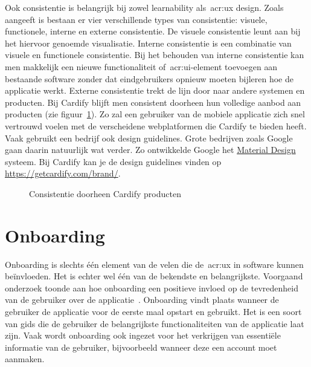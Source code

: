 Ook consistentie is belangrijk bij zowel learnability als~\acrshort{acr:ux} design. Zoals~\textcite{Nikolov2017} aangeeft is bestaan er vier verschillende types van consistentie: visuele, functionele, interne en externe consistentie. De visuele consistentie leunt aan bij het hiervoor genoemde visualisatie. Interne consistentie is een combinatie van visuele en functionele consistentie. Bij het behouden van interne consistentie kan men makkelijk een nieuwe functionaliteit of~\acrshort{acr:ui}-element toevoegen aan bestaande software zonder dat eindgebruikers opnieuw moeten bijleren hoe de applicatie werkt. Externe consistentie trekt de lijn door naar andere systemen en producten. Bij Cardify blijft men consistent doorheen hun volledige aanbod aan producten (zie figuur~\ref{fig:learnability:consistentie-cardify}). Zo zal een gebruiker van de mobiele applicatie zich snel vertrouwd voelen met de verscheidene webplatformen die Cardify te bieden heeft. Vaak gebruikt een bedrijf ook design guidelines. Grote bedrijven zoals Google gaan daarin natuurlijk wat verder. Zo ontwikkelde Google het \href{https://material.io/}{Material Design} systeem. Bij Cardify kan je de design guidelines vinden op \url{https://getcardify.com/brand/}.


\begin{figure}
    \centering
    \qquad
    \caption{Consistentie doorheen Cardify producten}
    \label{fig:learnability:consistentie-cardify}
\end{figure}

\section{Onboarding}
\label{sec:onboarding}

Onboarding is slechts één element van de velen die de~\acrlong{acr:ux} in software kunnen beïnvloeden. Het is echter wel één van de bekendste en belangrijkste. Voorgaand onderzoek toonde  aan hoe onboarding een positieve invloed op de tevredenheid van de gebruiker over de applicatie~\autocite{Cardoso2017}. Onboarding vindt plaats wanneer de gebruiker de applicatie voor de eerste maal opstart en gebruikt. Het is een soort van gids die de gebruiker de belangrijkste functionaliteiten van de applicatie laat zijn. Vaak wordt onboarding ook ingezet voor het verkrijgen van essentiële informatie van de gebruiker, bijvoorbeeld wanneer deze een account moet aanmaken.

